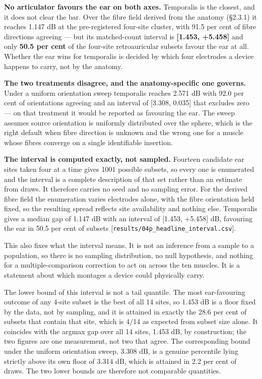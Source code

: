 \documentclass[
  11pt,
  letterpaper,
]{article}
\begin{document}
\textbf{No articulator favours the ear on both axes.} Temporalis is the closest,
and it does not clear the bar. Over the fibre field derived from the anatomy
(§2.3.1) it reaches \textminus{}1.147 dB at the pre-registered four-site cluster, with
91.5 per cent of fibre directions agreeing --- but its matched-count interval is
\textbf{{[}\textminus{}1.453, +5.458{]}} and only \textbf{50.5 per cent} of the four-site
retroauricular subsets favour the ear at all. Whether the ear wins for
temporalis is decided by which four electrodes a device happens to carry, not
by the anatomy.

\textbf{The two treatments disagree, and the anatomy-specific one governs.} Under a
uniform orientation sweep temporalis reaches \textminus{}2.571 dB with 92.0 per cent of
orientations agreeing and an interval of {[}\textminus{}3.308, \textminus{}0.035{]} that excludes zero ---
on that treatment it would be reported as favouring the ear. The sweep assumes
source orientation is uniformly distributed over the sphere, which is the right
default when fibre direction is unknown and the wrong one for a muscle whose
fibres converge on a single identifiable insertion.

\textbf{The interval is computed exactly, not sampled.} Fourteen candidate ear sites
taken four at a time gives 1001 possible subsets, so every one is enumerated and
the interval is a complete description of that set rather than an estimate from
draws. It therefore carries no seed and no sampling error. For the derived fibre
field the enumeration varies electrodes alone, with the fibre orientation held
fixed, so the resulting spread reflects site availability and nothing else.
Temporalis gives a median gap of \textminus{}1.147 dB with an interval of
{[}\textminus{}1.453, +5.458{]} dB, favouring the ear in 50.5 per cent of subsets
{[}\texttt{results/04p\_headline\_interval.csv}{]}.

This also fixes what the interval means. It is not an inference from a sample to
a population, so there is no sampling distribution, no null hypothesis, and
nothing for a multiple-comparison correction to act on across the ten muscles.
It is a statement about which montages a device could physically carry.

The lower bound of this interval is not a tail quantile. The most ear-favouring
outcome of any 4-site subset is the best of all 14 sites, so \textminus{}1.453 dB is a
floor fixed by the data, not by sampling, and it is attained in exactly the 28.6
per cent of subsets that contain that site, which is 4/14 as expected from
subset size alone. It coincides with the argmax gap over all 14 sites, \textminus{}1.453
dB, by construction; the two figures are one measurement, not two that agree.
The corresponding bound under the uniform orientation sweep, \textminus{}3.308 dB, is a
genuine percentile lying strictly above its own floor of \textminus{}3.314 dB, which is
attained in 2.2 per cent of draws. The two lower bounds are therefore not
comparable quantities.
\end{document}
